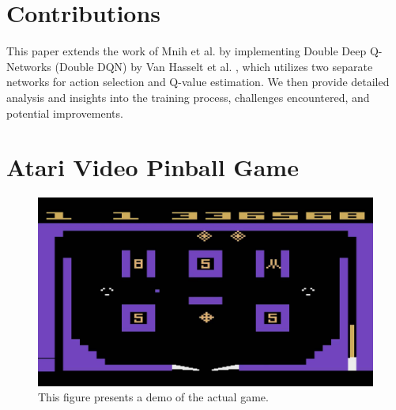 \section{Contributions}
This paper extends the work of Mnih et al. \cite{mnih2013playingatarideepreinforcement} by implementing Double Deep Q-Networks (Double DQN) by Van Hasselt et al. \cite{van_Hasselt_Guez_Silver_2016}, which utilizes two separate networks for action selection and Q-value estimation. We then provide detailed analysis and insights into the training process, challenges encountered, and potential improvements.

\section{Atari Video Pinball Game}

\begin{figure}[!h]
\centering
\centerline{\includegraphics[scale=0.17]{graphics/game.jpg}}
\caption{This figure presents a demo of the actual game.}
\label{fig: game}
\end{figure}

